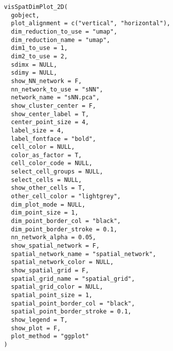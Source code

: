 \documentclass[a4paper]{book}
\begin{document}
\begin{Usage}
\begin{verbatim}
visSpatDimPlot_2D(
  gobject,
  plot_alignment = c("vertical", "horizontal"),
  dim_reduction_to_use = "umap",
  dim_reduction_name = "umap",
  dim1_to_use = 1,
  dim2_to_use = 2,
  sdimx = NULL,
  sdimy = NULL,
  show_NN_network = F,
  nn_network_to_use = "sNN",
  network_name = "sNN.pca",
  show_cluster_center = F,
  show_center_label = T,
  center_point_size = 4,
  label_size = 4,
  label_fontface = "bold",
  cell_color = NULL,
  color_as_factor = T,
  cell_color_code = NULL,
  select_cell_groups = NULL,
  select_cells = NULL,
  show_other_cells = T,
  other_cell_color = "lightgrey",
  dim_plot_mode = NULL,
  dim_point_size = 1,
  dim_point_border_col = "black",
  dim_point_border_stroke = 0.1,
  nn_network_alpha = 0.05,
  show_spatial_network = F,
  spatial_network_name = "spatial_network",
  spatial_network_color = NULL,
  show_spatial_grid = F,
  spatial_grid_name = "spatial_grid",
  spatial_grid_color = NULL,
  spatial_point_size = 1,
  spatial_point_border_col = "black",
  spatial_point_border_stroke = 0.1,
  show_legend = T,
  show_plot = F,
  plot_method = "ggplot"
)
\end{verbatim}
\end{Usage}
%
\end{document}
